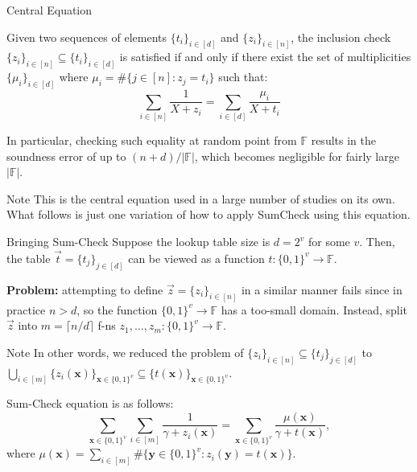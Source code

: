 \documentclass{zkdl-presentation-template}
\begin{document}
    \begin{frame}{Central Equation}
        \begin{theorem}
            Given two sequences of elements $\{t_i\}_{i \in [d]}$ and $\{z_i\}_{i \in
            [n]}$, the inclusion check $\{z_i\}_{i \in [n]} \subseteq \{t_i\}_{i \in
            [d]}$ is satisfied if and only if there exist the set of multiplicities
            $\{\mu_i\}_{i \in [d]}$ where $\mu_i = \#\{j \in [n]: z_j = t_i\}$ such that:
            \begin{equation*}
                \sum_{i \in [n]} \frac{1}{X+z_i} = \sum_{i \in [d]} \frac{\mu_i}{X+t_i}
            \end{equation*}
        \end{theorem}

         In particular, checking such equality at random point from $\mathbb{F}$
        results in the soundness error of up to $(n+d)/|\mathbb{F}|$, which becomes
        negligible for fairly large $|\mathbb{F}|$.

        \begin{alertblock}{Note}
            This is the central equation used in a large number of studies on its own. What follows 
            is just one variation of how to apply SumCheck using this equation.
        \end{alertblock}
    \end{frame}

    \begin{frame}{Bringing Sum-Check}
        Suppose the lookup table size is $d=2^v$ for some $v$. Then, the table
        $\vec{t} = \{t_j\}_{j \in [d]}$ can be viewed as a function $t:
        \{0,1\}^v \to \mathbb{F}$.

        \textcolor{red!70!black}{\textbf{Problem:}} attempting to define $\vec{z} = \{z_i\}_{i \in [n]}$
        in a similar manner fails since in practice $n>d$, so the function
        $\{0,1\}^v \to \mathbb{F}$ has a too-small domain. Instead, split $\vec{z}$ into 
        $m=\lceil n/d \rceil$ f-ns $z_1,\dots,z_m: \{0,1\}^v \to \mathbb{F}$.

        \begin{block}{Note}
            In other words, we reduced the problem of $\{z_i\}_{i \in [n]}
            \subseteq \{t_j\}_{j \in [d]}$ to $\bigcup_{i \in
            [m]}\{z_i(\mathbf{x})\}_{\mathbf{x} \in \{0,1\}^v} \subseteq
            \{t(\mathbf{x})\}_{\mathbf{x} \in \{0,1\}^v}$.
        \end{block}

        Sum-Check equation is as follows:
        \begin{equation*}
            \boxed{\sum_{\mathbf{x} \in \{0,1\}^v} \sum_{i \in [m]} \frac{1}{\gamma + z_i(\mathbf{x})} = \sum_{\mathbf{x} \in \{0,1\}^v} \frac{\mu(\mathbf{x})}{\gamma+t(\mathbf{x})}},
        \end{equation*}
        where $\mu(\mathbf{x}) = \sum_{i \in [m]}\#\{\mathbf{y} \in \{0,1\}^v:
        z_i(\mathbf{y})=t(\mathbf{x})\}$.
    \end{frame}
\end{document}
